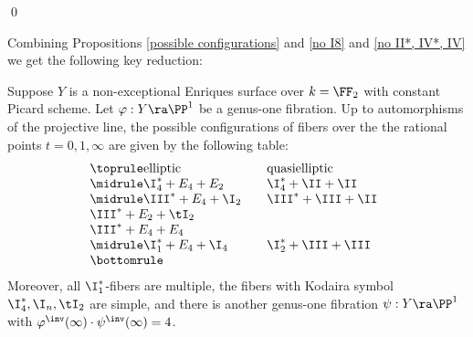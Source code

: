%
%
%
%
%
\qed


Combining  Propositions  \ref{possible configurations} and \ref{no I8} and  \ref{no II*, IV*, IV}  we get the following key reduction:

\begin{proposition}
\notready
\label{key reduction}
Suppose $Y$ is a non-exceptional Enriques surface over $k=\FF_2$ with constant Picard scheme.
Let $\varphi:Y\ra\PP^1$ be a genus-one fibration.
Up to  automorphisms of the projective line,
the possible configurations of fibers over the the rational points $t=0,1,\infty$ are given by
the following table:
$$
\begin{array}[c]{@{}lll}
\toprule
\text{elliptic}		& 		& \text{quasielliptic}\\
\midrule
\I_4^* +E_4+E_2		&		& \I_4^*+\II+\II\\
\midrule
\III^*+E_4+\I_2		&		& \III^*+\III+\II\\
\III^*+E_2+\tI_2\\
\III^*+E_4+E_4\\
\midrule
\I_1^*+E_4+\I_4	&		& \I_2^*+\III+\III\\
\bottomrule
\end{array}
$$
Moreover,   all $\I_1^*$-fibers are multiple, the fibers with Kodaira symbol  $\I_4^*,\I_n,\tI_2$ are simple,
and   there is another genus-one fibration
$\psi:Y\ra\PP^1$ with $\varphi^\inv(\infty)\cdot \psi^\inv(\infty)=4$.
\end{proposition}

